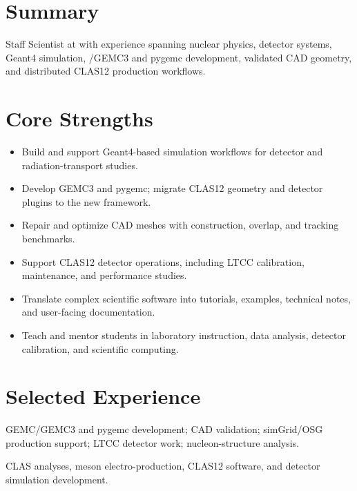 \documentclass[10pt,letterpaper]{article}
\begin{document}

\section*{Summary}
Staff Scientist at \MauriJLab{} with experience spanning nuclear physics,
detector systems, Geant4 simulation, \MauriGEMC{}/GEMC3 and pygemc development,
validated CAD geometry, and distributed CLAS12 production workflows.

\section*{Core Strengths}
\begin{itemize}
  \item Build and support Geant4-based simulation workflows for detector and radiation-transport studies.
  \item Develop GEMC3 and pygemc; migrate CLAS12 geometry and detector plugins to the new framework.
  \item Repair and optimize CAD meshes with construction, overlap, and tracking benchmarks.
  \item Support CLAS12 detector operations, including LTCC calibration, maintenance, and performance studies.
  \item Translate complex scientific software into tutorials, examples, technical notes, and user-facing documentation.
  \item Teach and mentor students in laboratory instruction, data analysis, detector calibration, and scientific computing.
\end{itemize}

\section*{Selected Experience}
{GEMC/GEMC3 and pygemc development; CAD validation; simGrid/OSG production support;
LTCC detector work; nucleon-structure analysis.}

{CLAS analyses, meson electro-production, CLAS12 software, and detector simulation development.}
\end{document}
